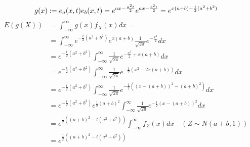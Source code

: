 \documentclass{article}
\begin{document}
\begin{equation}
g(x) := e_a(x, t) e_b(x, t) = e^{ax - \frac{a^2 t}{2}}  e^{ax - \frac{b^2 t}{2}} = e^{x(a + b) - \frac{t}{2} (a^2 + b^2)} \\[4px]
\end{equation}
\begin{equation*}
\begin{split}
E(g(X)) &= \int_{-\infty}^{\infty}g(x)f_X(x)dx = \\
&= \int_{-\infty}^{\infty} e^{-\frac{t}{2}(a^2 + b^2)} e^{x (a + b)} \frac{1}{\sqrt{2\pi}} e^{-\frac{x^2}{2}} dx \\
&= e^{-\frac{t}{2}(a^2 + b^2)} \int_{-\infty}^{\infty} \frac{1}{\sqrt{2\pi}} e^{-\frac{x^2}{2} + x (a + b)} dx \\
&= e^{-\frac{t}{2} (a^2 + b^2)} \int_{-\infty}^{\infty} \frac{1}{\sqrt{2\pi}} e^{-\frac{1}{2} (x^2 - 2x (a + b))} dx \\
&= e^{-\frac{t}{2} (a^2 + b^2)} \int_{-\infty}^{\infty} \frac{1}{\sqrt{2\pi}} e^{-\frac{1}{2} ((x - (a + b))^2 - (a + b)^2)} dx \\
&= e^{-\frac{t}{2} (a^2 + b^2)} e^{\frac{1}{2} (a + b)^2} \int_{-\infty}^{\infty} \frac{1}{\sqrt{2\pi}} e^{-\frac{1}{2} (x - (a + b))^2} dx \\
&= e^{\frac{1}{2} ((a + b)^2 - t (a^2 + b^2))} \int_{-\infty}^{\infty} f_Z(x) dx \quad (Z \sim N(a + b, 1)) \\
& = e^{\frac{1}{2} ((a + b)^2 - t (a^2 + b^2))}
\end{split}
\end{equation*}
\end{document}
